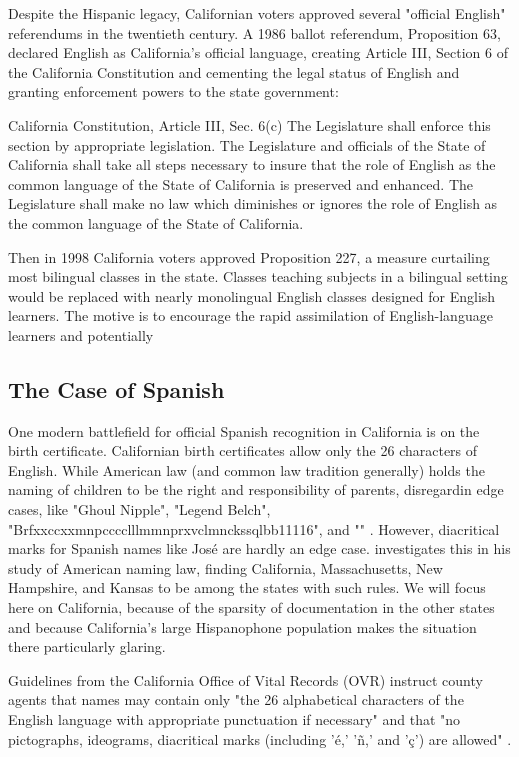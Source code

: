 Despite the Hispanic legacy, Californian voters approved several "official
English" referendums in the twentieth century. A 1986 ballot referendum,
Proposition 63, declared English as California's official language, creating
Article III, Section 6 of the California Constitution and cementing the legal
status of English and granting enforcement powers to the state government: 

\begin{aquote}{California Constitution, Article III, Sec. 6(c)}
	The Legislature shall enforce this section by appropriate legislation. The
	Legislature and officials of the State of California shall take all steps
	necessary to insure that the role of English as the common language of the
	State of California is preserved and enhanced. The Legislature shall make no
	law which diminishes or ignores the role of English as the common language of
	the State of California.
\end{aquote}

Then in 1998 California voters approved Proposition 227, a measure curtailing
most bilingual classes in the state. Classes teaching subjects in a bilingual
setting would be replaced with nearly monolingual English classes designed for
English learners. The motive is to encourage the rapid assimilation of
English-language learners and potentially 

\subsection{The Case of Spanish}

One modern battlefield for official Spanish recognition in California is on the
birth certificate. Californian birth certificates allow only the 26 characters
of English. While American law (and common law tradition generally) holds the
naming of children to be the right and responsibility of parents, disregardin
edge cases, like "Ghoul Nipple", "Legend Belch",
"Brfxxccxxmnpcccclllmmnprxvclmnckssqlbb11116", and "" \parencite{larson11}.
However, diacritical marks for Spanish names like José are hardly an edge case.
\textcite[5]{larson11} investigates this in his study of American naming law,
finding California, Massachusetts, New Hampshire, and Kansas to be among the
states with such rules. We will focus here on California, because of the
sparsity of documentation in the other states and because California's large
Hispanophone population makes the situation there particularly glaring.

Guidelines from the California Office of Vital Records (OVR) instruct county
agents that names may contain only "the 26 alphabetical characters of the
English language with appropriate punctuation if necessary" and that "no
pictographs, ideograms, diacritical marks (including 'é,' 'ñ,' and 'ç') are
allowed" \parencite{larson11}.

